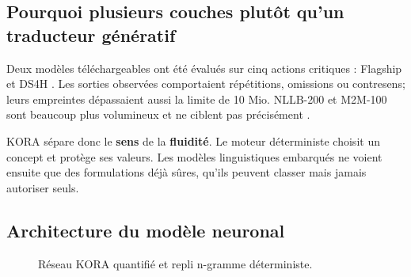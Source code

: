 \subsection{Pourquoi plusieurs couches plutôt qu’un traducteur génératif}

Deux modèles téléchargeables ont été évalués sur cinq actions critiques :
Flagship  et DS4H . Les
sorties observées comportaient répétitions, omissions ou contresens; leurs
empreintes dépassaient aussi la limite de 10 Mio. NLLB-200 et M2M-100 sont
beaucoup plus volumineux et ne ciblent pas précisément .

KORA sépare donc le \textbf{sens} de la \textbf{fluidité}. Le moteur
déterministe choisit un concept et protège ses valeurs. Les modèles
linguistiques embarqués ne voient ensuite que des formulations 
déjà sûres, qu’ils peuvent classer mais jamais autoriser seuls.

\subsection{Architecture du modèle neuronal}

\begin{figure}[H]
\centering
{}
\caption{Réseau KORA quantifié et repli n-gramme déterministe.}
\end{figure}

